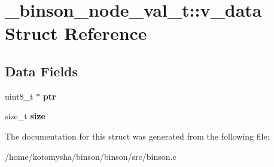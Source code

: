 \hypertarget{struct__binson__node__val__t_1_1v__data}{\section{\-\_\-binson\-\_\-node\-\_\-val\-\_\-t\-:\-:v\-\_\-data Struct Reference}
\label{struct__binson__node__val__t_1_1v__data}
}
\subsection*{Data Fields}
\begin{DoxyCompactItemize}
\item 
\hypertarget{struct__binson__node__val__t_1_1v__data_aaa8222c604b0b520bc2205ddcc42d855}{uint8\-\_\-t $\ast$ {\bfseries ptr}}\label{struct__binson__node__val__t_1_1v__data_aaa8222c604b0b520bc2205ddcc42d855}

\item 
\hypertarget{struct__binson__node__val__t_1_1v__data_a854352f53b148adc24983a58a1866d66}{size\-\_\-t {\bfseries size}}\label{struct__binson__node__val__t_1_1v__data_a854352f53b148adc24983a58a1866d66}

\end{DoxyCompactItemize}


The documentation for this struct was generated from the following file\-:\begin{DoxyCompactItemize}
\item 
/home/kotomysha/binson/binson/src/binson.\-c\end{DoxyCompactItemize}
